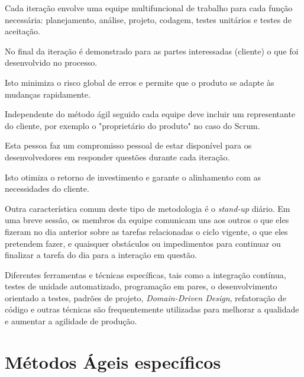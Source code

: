 \par Cada iteração envolve uma equipe multifuncional de trabalho para cada função necessária: planejamento, análise, projeto, codagem, testes unitários e testes de aceitação.
\par No final da iteração é demonstrado para as partes interessadas (cliente) o que foi desenvolvido no processo.
\par Isto minimiza o risco global de erros e permite que o produto se adapte às mudanças rapidamente. 
\par Independente do método ágil seguido cada equipe deve incluir um representante do cliente, por exemplo o "proprietário do produto" no caso do Scrum. 
\par Esta pessoa faz um compromisso pessoal de estar disponível para os desenvolvedores em responder questões durante cada iteração. 
\par Isto otimiza o retorno de investimento e garante o alinhamento com as necessidades do cliente.
\par Outra característica comum deste tipo de metodologia é o \emph{stand-up} diário. Em uma breve sessão, os membros da equipe comunicam uns aos outros o que eles fizeram no dia anterior sobre as tarefas relacionadas o ciclo vigente, o que eles pretendem fazer, e quaisquer obstáculos ou impedimentos para continuar ou finalizar a tarefa do dia para a interação em questão.
\par Diferentes ferramentas e técnicas específicas, tais como a integração contínua, testes de unidade automatizado, programação em pares, o desenvolvimento orientado a testes, padrões de projeto, \emph{Domain-Driven Design}, refatoração de código e outras técnicas são frequentemente utilizadas para melhorar a qualidade e aumentar a agilidade de produção.

\section{Métodos Ágeis específicos}
